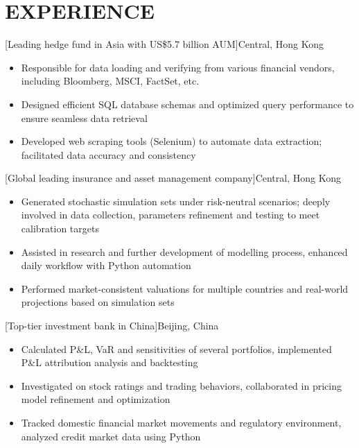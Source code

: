 \documentclass[cmu]{resume}
\begin{document}
    \section{EXPERIENCE}
    [Leading hedge fund in Asia with US\$5.7 billion AUM]{Central, Hong Kong}
    \begin{itemize}
        \item Responsible for data loading and verifying from various financial vendors, including Bloomberg, MSCI, FactSet, etc.
        \item Designed efficient SQL database schemas and optimized query performance to ensure seamless data retrieval
        \item Developed web scraping tools (Selenium) to automate data extraction; facilitated data accuracy and consistency
    \end{itemize}

    [Global leading insurance and asset management company]{Central, Hong Kong}
    \begin{itemize}
        \item Generated stochastic simulation sets under risk-neutral scenarios; deeply involved in data collection, parameters refinement and testing to meet calibration targets
        \item Assisted in research and further development of modelling process, enhanced daily workflow with Python automation
        \item Performed market-consistent valuations for multiple countries and real-world projections based on simulation sets
    \end{itemize}

    [Top-tier investment bank in China]{Beijing, China}
    \begin{itemize}
        \item Calculated P\&L, VaR and sensitivities of several portfolios, implemented P\&L attribution analysis and backtesting
        \item Investigated on stock ratings and trading behaviors, collaborated in pricing model refinement and optimization
        \item Tracked domestic financial market movements and regulatory environment, analyzed credit market data using Python
    \end{itemize}
\end{document}
